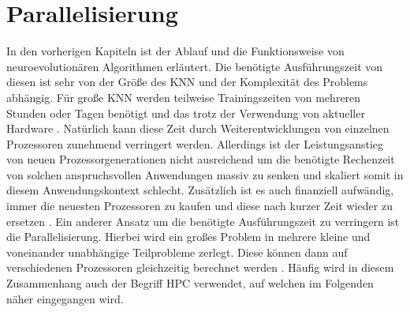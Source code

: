 \section{Parallelisierung}
In den vorherigen Kapiteln ist der Ablauf und die Funktionsweise von neuroevolutionären Algorithmen erläutert. Die benötigte Ausführungszeit von diesen ist sehr von der Größe des \ac{KNN} und der Komplexität des Problems abhängig. Für große \ac{KNN} werden teilweise Trainingszeiten von mehreren Stunden oder Tagen benötigt und das trotz der Verwendung von aktueller Hardware \cite{such2017deep}. Natürlich kann diese Zeit durch Weiterentwicklungen von einzelnen Prozessoren zunehmend verringert werden. Allerdings ist der Leistungsanstieg von neuen Prozessorgenerationen nicht ausreichend um die benötigte Rechenzeit von solchen anspruchsvollen Anwendungen massiv zu senken und skaliert somit in diesem Anwendungskontext schlecht. Zusätzlich ist es auch finanziell aufwändig, immer die neuesten Prozessoren zu kaufen und diese nach kurzer Zeit wieder zu ersetzen \cite{swann2002maximum}. Ein anderer Ansatz um die benötigte Ausführungszeit zu verringern ist die Parallelisierung. Hierbei wird ein großes Problem in mehrere kleine und voneinander unabhängige Teilprobleme zerlegt. Diese können dann auf verschiedenen Prozessoren gleichzeitig berechnet werden \cite{swann2002maximum}. Häufig wird in diesem Zusammenhang auch der Begriff \ac{HPC} verwendet, auf welchen im Folgenden näher eingegangen wird.

